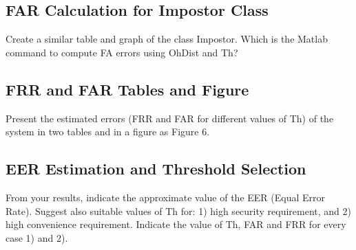 \documentclass[a4paper,12pt]{article}
\begin{document}
\subsection{FAR Calculation for Impostor Class}
Create a similar table and graph of the class Impostor. Which is the Matlab command to compute FA errors using OhDist and Th?


\subsection{FRR and FAR Tables and Figure}
Present the estimated errors (FRR and FAR for different values of Th) of the system in two tables and in a figure as Figure 6.

\subsection{EER Estimation and Threshold Selection}
From your results, indicate the approximate value of the EER (Equal Error Rate). Suggest also suitable values of Th for: 1) high security requirement, and 2) high convenience requirement. Indicate the value of Th, FAR and FRR for every case 1) and 2).



\tableofcontents
\newpage

\listoffigures
\newpage

\listoftables
\newpage


\newpage
\printbibliography
\end{document}
